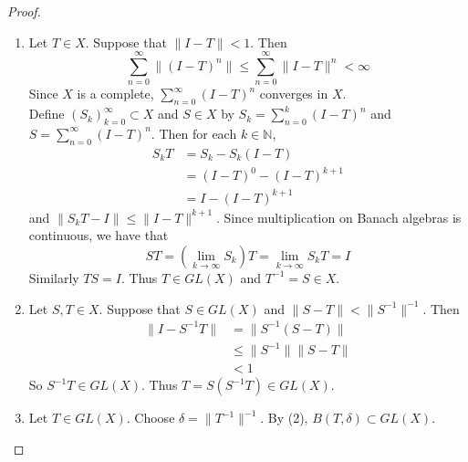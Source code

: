 \documentclass[12pt]{amsart}
\theoremstyle{definition}
\newcommand{\del}{\delta}
\newcommand{\N}{\mathbb{N}}
\begin{document}
	\begin{proof}\
		\begin{enumerate}
			\item Let $T \in X$. Suppose that $\|I-T \|< 1$. Then $$\sum_{n=0}^{\infty} \|(I -T)^n \| \leq \sum_{n=0}^{\infty} \|I -T \|^{n} < \infty$$ Since $X$ is a complete, $\sum\limits_{n=0}^{\infty}(I-T)^n$ converges in $X$.\\
			Define $(S_k)_{k=0}^{\infty} \subset X$ and $S \in X$ by $S_k = \sum\limits_{n=0}^{k} (I-T)^n$ and \\ $S = \sum\limits_{n=0}^{\infty}(I-T)^n$. Then for each $k \in \N$,
			\begin{align*}
				S_k T
				&= S_k - S_k(I-T) \\
				&= (I-T)^0 - (I-T)^{k+1} \\
				&= I - (I-T)^{k+1}
			\end{align*}
			and $\|S_kT - I \|\leq \|I-T \|^{k+1}$. Since multiplication on Banach algebras is continuous, we have that $$ST = (\lim_{k \rightarrow \infty} S_k)T = \lim\limits_{k \rightarrow \infty}S_kT = I$$
			Similarly $TS = I$. Thus $T \in GL(X)$ and $T^{-1} = S \in X$. \vspace{.5cm}\\
			\item  Let $S, T \in X$. Suppose that $S \in GL(X)$ and $\|S-T \|< \|S^{-1} \|^{-1}$. Then 
			\begin{align*}
				\|I - S^{-1}T \|
				& = \|S^{-1}(S - T) \|\\
				& \leq \|S^{-1} \|\|S -T \|\\
				&< 1
			\end{align*}
			So $S^{-1}T \in GL(X)$. Thus $T = S (S^{-1}T) \in GL(X)$. \vspace{.5cm}\\
			\item Let $T \in GL(X)$. Choose $\del = \|T^{-1}\|^{-1}$. By (2), $B(T, \del) \subset GL(X)$.
		\end{enumerate}
	\end{proof}	
	
	
	
	
	











	
	
	
	
	
	
\end{document}
